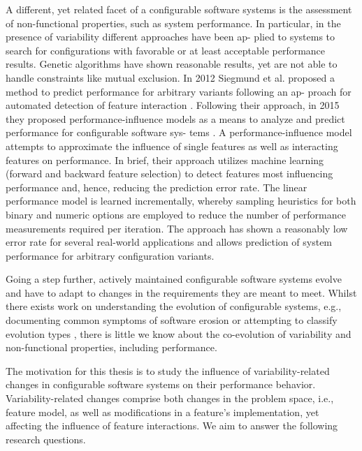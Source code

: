 \documentclass[bibliography=totoc]{tubsreprt}
\begin{document}
A different, yet related facet of a configurable software systems is the assessment of non-functional properties,
such as system performance. In particular, in the presence of variability different approaches have been ap-
plied to systems to search for configurations with favorable or at least acceptable performance results. Genetic
algorithms \cite{guo_genetic_2011,sayyad_scalable_2013} have shown reasonable
results, yet are not able to handle constraints like mutual exclusion.
In 2012 Siegmund et al. proposed a method to predict performance for arbitrary variants following an ap-
proach for automated detection of feature interaction
\cite{siegmund_predicting_2012}. Following their approach, in 2015 they proposed performance-influence models as a means to
analyze and predict performance for configurable software sys- tems
\cite{siegmund_performance-influence_2015}. A performance-influence model attempts to approximate the influence of single features as well as interacting features on performance. In
brief, their approach utilizes machine learning (forward and backward feature selection) to detect features most influencing performance and, hence, reducing the prediction error
rate. The linear performance model is learned incrementally, whereby sampling heuristics for both binary and
numeric options are employed to reduce the number of performance measurements required per iteration. The
approach has shown a reasonably low error rate for several real-world applications and allows prediction of
system performance for arbitrary configuration variants.

Going a step further, actively maintained configurable software systems evolve and have to adapt to changes
in the requirements they are meant to meet. Whilst there exists work on understanding the evolution of
configurable systems, e.g., documenting common symptoms of software erosion
\cite{passos_feature_2015,zhang_variability_2013} or attempting to classify
evolution types \cite{peng_analyzing_2011,seidl_co-evolution_2012}, there is
little we know about the co-evolution of variability and non-functional properties, including performance.

The motivation for this thesis is to study the influence of variability-related changes in configurable software
systems on their performance behavior. Variability-related changes comprise both changes in the problem space,
i.e., feature model, as well as modifications in a feature’s implementation, yet affecting the influence of feature
interactions. We aim to answer the following research questions.
\end{document}
